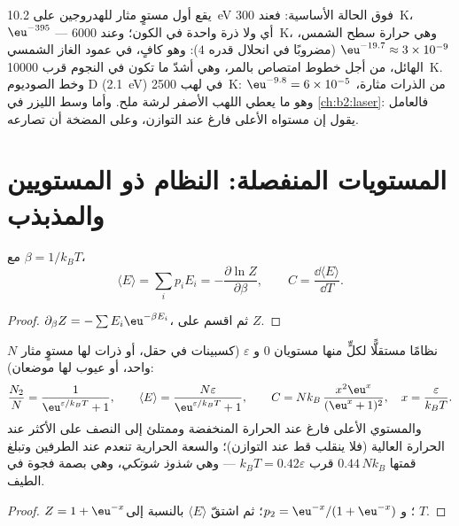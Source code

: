 \begin{example}\label{ex:b2:boltzmann-factor:levels}
يقع أول مستوٍ مثار للهدروجين على \qty{10.2}{eV} فوق الحالة
الأساسية: فعند \qty{300}{K}، $\eu^{-395}$ --- أي ولا ذرة واحدة في الكون؛ وعند
\qty{6000}{K}، وهي حرارة سطح الشمس، $\eu^{-19.7} \approx 3 \times 10^{-9}$ (مضروبًا
في انحلال قدره $4$): وهو كافٍ، في عمود الغاز الشمسي الهائل، من أجل
خطوط امتصاص بالمر، وهي أشدّ ما تكون في النجوم قرب \qty{10000}{K}.
وخط الصوديوم D (\qty{2.1}{eV}) في لهب \qty{2500}{K}: $\eu^{-9.8} = 6
\times 10^{-5}$ من الذرات مثارة، وهو ما يعطي اللهب الأصفر لرشة
ملح. وأما وسط الليزر في \cref{ch:b2:laser}: فالعامل
يقول إن مستواه الأعلى فارغ عند التوازن، وعلى المضخة أن تصارعه.
\end{example}

\section{المستويات المنفصلة: النظام ذو المستويين والمذبذب}

\begin{proposition}\label{prop:b2:boltzmann-factor:meanE}
مع $\beta = 1/k_BT$،
\[
\langle E\rangle = \sum_ip_iE_i = -\frac{\partial\ln Z}{\partial\beta}, \qquad
C = \frac{\dd\langle E\rangle}{\dd T} .
\]
\end{proposition}

\begin{proof}
$\partial_\beta Z = -\sum E_i\eu^{-\beta E_i}$، ثم اقسم على $Z$.
\end{proof}

\begin{proposition}\label{prop:b2:boltzmann-factor:twolevel}
$N$ نظامًا مستقلًّا لكلٍّ منها مستويان $0$ و $\varepsilon$ (كسبينات في
حقل، أو ذرات لها مستوٍ مثار واحد، أو عيوب لها موضعان):
\[
\frac{N_2}{N} = \frac{1}{\eu^{\varepsilon/k_BT} + 1}, \qquad
\langle E\rangle = \frac{N\varepsilon}{\eu^{\varepsilon/k_BT} + 1}, \qquad
C = Nk_B\,\frac{x^2\eu^x}{(\eu^x + 1)^2}, \quad x = \frac{\varepsilon}{k_BT} .
\]
والمستوي الأعلى فارغ عند الحرارة المنخفضة وممتلئ إلى النصف على الأكثر عند
الحرارة العالية (فلا ينقلب قط عند التوازن)؛ والسعة الحرارية
تنعدم عند الطرفين وتبلغ قمتها $0.44\,Nk_B$ قرب $k_BT = 0.42
\varepsilon$ --- وهي \emph{شذوذ شوتكي}، وهي
بصمة فجوة في الطيف.
\end{proposition}

\begin{proof}
$Z = 1 + \eu^{-x}$؛ و $p_2 = \eu^{-x}/(1 + \eu^{-x})$؛ ثم اشتقّ $\langle
E\rangle$ بالنسبة إلى $T$.
\end{proof}

